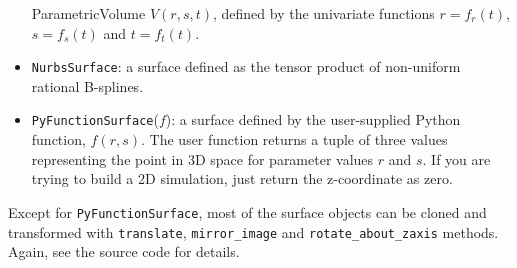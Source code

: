 \begin{itemize}
  ParametricVolume $V(r,s,t)$, defined by the univariate functions 
  $r=f_r(t)$, $s=f_s(t)$ and $t=f_t(t)$.
\item \texttt{NurbsSurface}: a surface defined as the tensor product of non-uniform rational B-splines.
\item \texttt{PyFunctionSurface}($f$): a surface defined by the user-supplied Python function, $f(r,s)$.
  The user function returns a tuple of three values representing the point in 3D space 
  for parameter values $r$ and $s$.
  If you are trying to build a 2D simulation, just return the z-coordinate as zero.
\end{itemize} 

Except for \texttt{PyFunctionSurface}, most of the surface objects can be cloned and transformed
with \texttt{translate}, \texttt{mirror\_image} and \texttt{rotate\_about\_zaxis} methods.
Again, see the source code for details.


